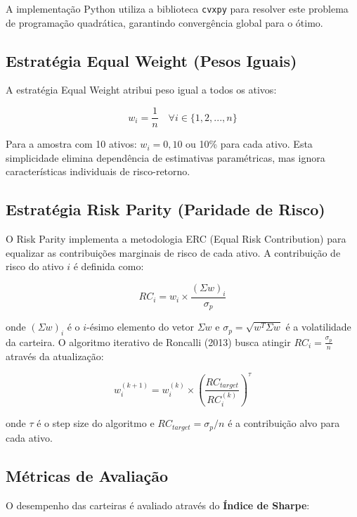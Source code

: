 A implementação Python utiliza a biblioteca \texttt{cvxpy} para resolver este problema de programação quadrática, garantindo convergência global para o ótimo.

\subsection{Estratégia Equal Weight (Pesos Iguais)}

A estratégia Equal Weight atribui peso igual a todos os ativos:

\begin{equation}
w_i = \frac{1}{n} \quad \forall i \in \{1, 2, ..., n\}
\end{equation}

Para a amostra com 10 ativos: $w_i = 0,10$ ou 10\% para cada ativo. Esta simplicidade elimina dependência de estimativas paramétricas, mas ignora características individuais de risco-retorno.

\subsection{Estratégia Risk Parity (Paridade de Risco)}

O Risk Parity implementa a metodologia ERC (Equal Risk Contribution) para equalizar as contribuições marginais de risco de cada ativo. A contribuição de risco do ativo $i$ é definida como:

\begin{equation}
RC_i = w_i \times \frac{(\Sigma w)_i}{\sigma_p}
\end{equation}

onde $(\Sigma w)_i$ é o $i$-ésimo elemento do vetor $\Sigma w$ e $\sigma_p = \sqrt{w^T \Sigma w}$ é a volatilidade da carteira. O algoritmo iterativo de Roncalli (2013) busca atingir $RC_i = \frac{\sigma_p}{n}$ através da atualização:

\begin{equation}
w_i^{(k+1)} = w_i^{(k)} \times \left(\frac{RC_{target}}{RC_i^{(k)}}\right)^{\tau}
\end{equation}

onde $\tau$ é o step size do algoritmo e $RC_{target} = \sigma_p/n$ é a contribuição alvo para cada ativo.

\subsection{Métricas de Avaliação}

O desempenho das carteiras é avaliado através do \textbf{Índice de Sharpe}:

